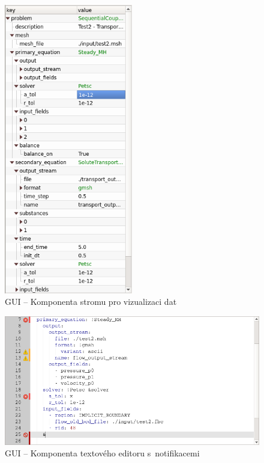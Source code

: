 \documentclass[FM,bw,DP]{tulthesis}
\begin{document}
\begin{figure}[h]
	\centering
    \includegraphics[width=0.5\textwidth]{../img/screenshots/gui_tree.png}
    \caption{GUI -- Komponenta stromu pro vizualizaci dat}
	\label{img:gui_tree}
\end{figure}

\clearpage

\begin{figure}[ht]
	\centering
    \includegraphics[width=\textwidth]{../img/screenshots/gui_editor_notifications.png}
    \caption{GUI -- Komponenta textového editoru s~notifikacemi}
	\label{img:gui_editor_notifications}
\end{figure}
\end{document}
